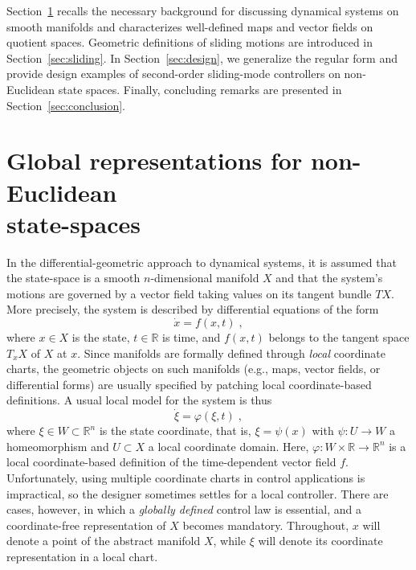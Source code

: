 \documentclass{article}
\theoremstyle{definition}
\theoremstyle{remark}
\newcommand{\MA}{X}	%
\newcommand{\NE}{U}	%
\newcommand{\RR}{\mathbb{R}}	%
\begin{document}
Section~\ref{sec:global_rep} recalls the necessary background for discussing dynamical systems on smooth manifolds and characterizes 
well-defined maps and vector fields on quotient spaces. Geometric definitions of sliding motions are introduced in Section~\ref{sec:sliding}.
In Section~\ref{sec:design}, we generalize the regular form and provide design examples of second-order sliding-mode controllers on
non-Euclidean state spaces. Finally, concluding remarks are presented in Section~\ref{sec:conclusion}.


\section{Global representations for non-Euclidean \\ state-spaces} \label{sec:global_rep}

In the differential-geometric approach to dynamical systems, it is assumed that the state-space is a smooth
$n$-dimensional manifold $\MA$ and that the system's motions are governed by a vector field taking values on its 
tangent bundle $T\MA$. More precisely, the system is described by differential equations of the form
\begin{equation} \label{eq:system}
 \dot{x} = f(x,t) \;,
\end{equation}
where $x \in \MA$ is the state, $t \in \RR$ is time, and $f(x,t)$ belongs to the tangent space $T_{x} \MA$ of $\MA$ at $x$.
Since manifolds are formally defined through \emph{local} coordinate charts, the geometric 
objects on such manifolds (e.g., maps, vector fields, or differential forms) are usually specified by patching 
local coordinate-based definitions. A usual local model for the system is thus
\begin{equation} \label{eq:systemD}
 \dot{\xi} = \varphi(\xi,t) \;,
\end{equation}
where $\xi \in W \subset \RR^n$ is the state coordinate, that is, $\xi = \psi(x)$ with $\psi : \NE \to W$ a homeomorphism
and $\NE \subset \MA$ a local coordinate domain. Here, $\varphi : W\times\RR \to \RR^n$ is a local coordinate-based definition of the time-dependent
vector field $f$. Unfortunately, using multiple coordinate charts in control applications is impractical, so the designer sometimes settles
for a local controller. There are cases, however, in which a \emph{globally defined} control law is essential, and a
coordinate-free representation of $\MA$ becomes mandatory. Throughout, $x$ will denote
a point of the abstract manifold $\MA$, while $\xi$ will denote its coordinate representation in a local chart.
\end{document}
